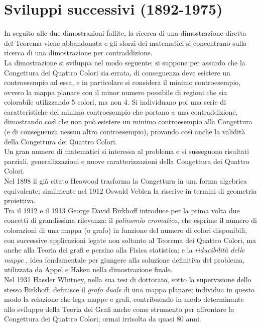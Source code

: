 \documentclass[a4paper,12pt,titlepage]{report}
\begin{document}
	\section[Sviluppi successivi]{Sviluppi successivi (1892-1975)}
	 In seguito alle due dimostrazioni fallite, la ricerca di una dimostrazione diretta del Teorema viene abbandonata e gli sforzi dei matematici si concentrano sulla ricerca di una dimostrazione per contraddizione. 
	 \\La dimostrazione si sviluppa nel modo seguente: si suppone per assurdo che la Congettura dei Quattro Colori sia errata, di conseguenza deve esistere un controesempio ad essa, e in particolare si considera il minimo controesempio, ovvero la mappa planare con il minor numero possibile di regioni che sia colorabile utilizzando 5 colori, ma non 4. Si individuano poi una serie di caratteristiche del minimo controesempio che portano a una contraddizione, dimostrando così che non può esistere un minimo controesempio alla Congettura (e di conseguenza nessun altro controesempio), provando così anche la validità della Congettura dei Quattro Colori.
	 \\Un gran numero di matematici si interessa al problema e si susseguono risultati parziali, generalizzazioni e nuove caratterizzazioni della Congettura dei Quattro Colori.
	 \\Nel 1898 il già citato Heawood trasforma la Congettura in una forma algebrica equivalente; similmente nel 1912 Oswald Veblen la riscrive in termini di geometria proiettiva.
	 \\Tra il 1912 e il 1913 George David Birkhoff introduce per la prima volta due concetti di grandissima rilevanza: il \emph{polinomio cromatico}, che esprime il numero di colorazioni di una mappa (o grafo) in funzione del numero di colori disponibili, con successive applicazioni legate non soltanto al Teorema dei Quattro Colori, ma anche alla Teoria dei grafi e persino alla Fisica statistica; e la \emph{riducibilità delle mappe} {\bfseries \cite{Birkhoff}}, idea fondamentale per giungere alla soluzione definitiva del problema, utilizzata da Appel e Haken nella dimostrazione finale.
	 \\Nel 1931 Hassler Whitney, nella sua tesi di dottorato, sotto la supervisione dello stesso Birkhoff, definisce il \emph{grafo duale} di una mappa planare; individua in questo modo la relazione che lega mappe e grafi, contribuendo in modo determinante allo sviluppo della Teoria dei Grafi anche come strumento per affrontare la Congettura dei Quattro Colori, ormai irrisolta da quasi 80 anni.
\end{document}
